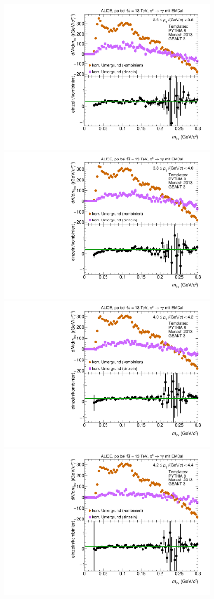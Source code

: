 \begin{figure}[t]
\begin{multicols}{2}
\end{multicols}
\begin{multicols}{2}
    \includegraphics[width=.65\linewidth]{Anhang/BackgroundWithRatio12_Data_2016.pdf}\par
    \includegraphics[width=.65\linewidth]{Anhang/BackgroundWithRatio13_Data_2016.pdf}\par
\end{multicols}
\begin{multicols}{2}
    \includegraphics[width=.65\linewidth]{Anhang/BackgroundWithRatio14_Data_2016.pdf}\par
    \includegraphics[width=.65\linewidth]{Anhang/BackgroundWithRatio15_Data_2016.pdf}\par
\end{multicols}
\end{figure}
\clearpage

